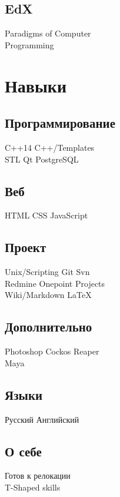 \documentclass[a4paper]{curricula-vitae}
\begin{document}
\begin{minipage}[t]{0.33\textwidth}
\insertspace

\subsection{EdX}
Paradigms of Computer \\
Programming

\insertspace

\section{Навыки}

\subsection{Программирование}
C++14 \textbullet{} C++/Templates \\
STL \textbullet{} Qt \textbullet{} PostgreSQL


\insertspace

\subsection{Веб}
HTML \textbullet{} CSS \textbullet{} JavaScript

\insertspace

\subsection{Проект}
Unix/Scripting \textbullet{} Git \textbullet{} Svn \\
Redmine \textbullet{} Onepoint Projects \\
Wiki/Markdown \textbullet{} \LaTeX

\insertspace

\subsection{Дополнительно}
Photoshop \textbullet{} Cockos Reaper \\
Maya

\insertspace

\subsection{Языки}
Русский \textbullet{} Английский

\insertspace

\subsection{О себе}
Готов к релокации \\
T-Shaped skills


\end{minipage}
\end{document}
